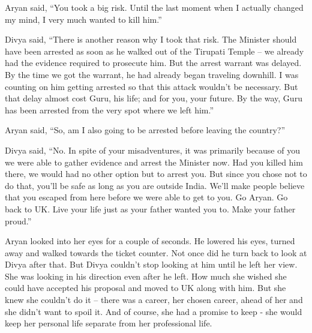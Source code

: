 Aryan said, “You took a big risk. Until the last moment when I actually changed
my mind, I very much wanted to kill him.”

Divya said, “There is another reason why I took that risk. The Minister should
have been arrested as soon as he walked out of the Tirupati Temple – we already
had the evidence required to prosecute him. But the arrest warrant was delayed.
By the time we got the warrant, he had already began traveling downhill. I was
counting on him getting arrested so that this attack wouldn't be necessary. But
that delay almost cost Guru, his life; and for you, your future. By the way,
Guru has been arrested from the very spot where we left him.”

Aryan said, “So, am I also going to be arrested before leaving the country?”

Divya said, “No. In spite of your misadventures, it was primarily because of you
we were able to gather evidence and arrest the Minister now. Had you killed him
there, we would had no other option but to arrest you. But since you chose not
to do that, you'll be safe as long as you are outside India. We'll make people
believe that you escaped from here before we were able to get to you. Go Aryan.
Go back to UK. Live your life just as your father wanted you to. Make your
father proud.”

Aryan looked into her eyes for a couple of seconds. He lowered his eyes, turned
away and walked towards the ticket counter. Not once did he turn back to look at
Divya after that. But Divya couldn't stop looking at him until he left her view.
She was looking in his direction even after he left. How much she wished she
could have accepted his proposal and moved to UK along with him. But she knew
she couldn't do it – there was a career, her chosen career, ahead of her and she
didn't want to spoil it. And of course, she had a promise to keep - she would
keep her personal life separate from her professional life.